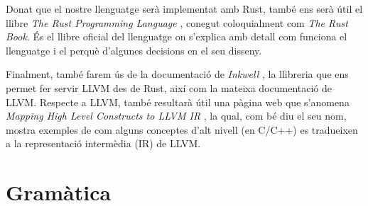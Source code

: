 ﻿\documentclass{article}
\begin{document}
Donat que el nostre llenguatge serà implementat amb Rust, també ens serà útil
el llibre \textit{The Rust Programming Language} \cite{rustbook}, conegut
coloquialment com \textit{The Rust Book}. És el llibre oficial del llenguatge
on s'explica amb detall com funciona el llenguatge i el perquè d'algunes
decisions en el seu disseny.

Finalment, també farem ús de la documentació de \textit{Inkwell} \cite{inkwell},
la llibreria que ens permet fer servir LLVM des de Rust, així com la mateixa
documentació de LLVM. Respecte a LLVM, també resultarà útil una pàgina web
que s'anomena \textit{Mapping High Level Constructs to LLVM IR} \cite{mhlctllvm},
la qual, com bé diu el seu nom, mostra exemples de com alguns conceptes d'alt
nivell (en C/C++) es tradueixen a la representació intermèdia (IR) de LLVM.

\section{Gramàtica}
\end{document}

